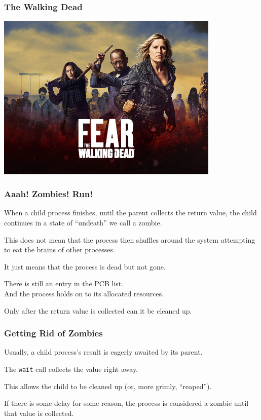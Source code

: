 \begin{frame}
	\frametitle{The Walking Dead}

	\begin{center}
		\includegraphics[width=0.8\textwidth]{images/walking-dead.jpg}
	\end{center}

\end{frame}



\begin{frame}
	\frametitle{Aaah! Zombies! Run!}

	When a child process finishes, until the parent collects the return value, the child continues in a state of ``undeath'' we call a \alert{zombie}.

	This does not mean that the process then shuffles around the system attempting to eat the brains of other processes.

	It just means that the process is dead but not gone.

	There is still an entry in the PCB list.\\
	\quad And the process holds on to its allocated resources.

	Only after the return value is collected can it be cleaned up.

\end{frame}

\begin{frame}
	\frametitle{Getting Rid of Zombies}

	Usually, a child process's result is eagerly awaited by its parent.

	The \texttt{wait} call collects the value right away.

	This allows the child to be cleaned up (or, more grimly, ``reaped'').

	If there is some delay for some reason, the process is considered a zombie until that value is collected.

\end{frame}


